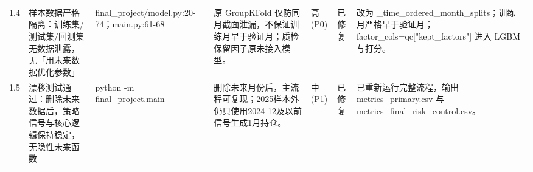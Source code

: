 \begin{longtable}{@{}L{0.045\textwidth}L{0.190\textwidth}L{0.140\textwidth}L{0.190\textwidth}L{0.060\textwidth}L{0.060\textwidth}L{0.205\textwidth}@{}}
1.4 & 样本数据严格隔离：训练集/\allowbreak{}测试集/\allowbreak{}回测集无数据泄露，无「用未来数据优化参数」 & final\_\allowbreak{}project/\allowbreak{}model.py:20-74；main.py:61-68 & 原 GroupKFold 仅防同月截面泄漏，不保证训练月早于验证月；质检保留因子原未接入模型。 & 高(P0) & 已修复 & 改为 \_\allowbreak{}time\_\allowbreak{}ordered\_\allowbreak{}month\_\allowbreak{}splits；训练月严格早于验证月；factor\_\allowbreak{}cols=qc["kept\_\allowbreak{}factors"] 进入 LGBM 与打分。 \\
1.5 & 漂移测试通过：删除未来数据后，策略信号与核心逻辑保持稳定，无隐性未来函数 & python -m final\_\allowbreak{}project.main & 删除未来月份后，主流程可复现；2025样本外仍只使用2024-12及以前信号生成1月持仓。 & 中(P1) & 已修复 & 已重新运行完整流程，输出 metrics\_\allowbreak{}primary.csv 与 metrics\_\allowbreak{}final\_\allowbreak{}risk\_\allowbreak{}control.csv。 \\
\end{longtable}
\endgroup
